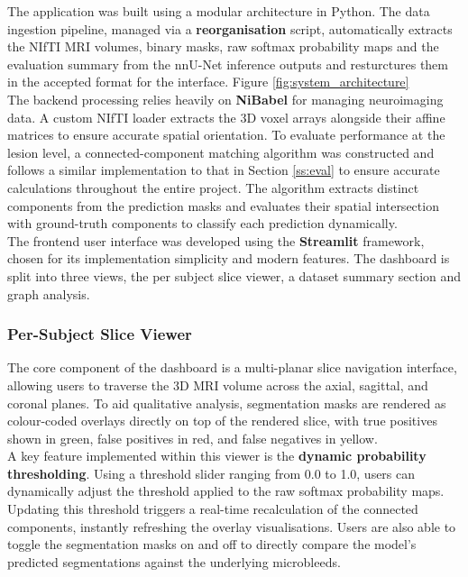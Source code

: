 \documentclass{aifyp}
\begin{document}
The application was built using a modular architecture in Python. The data ingestion pipeline, managed via a \textbf{reorganisation} script, automatically extracts the NIfTI MRI volumes, binary masks, raw softmax probability maps and the evaluation summary from the nnU-Net inference outputs and resturctures them in the accepted format for the interface.  Figure \ref{fig:system_architecture}
\\

The backend processing relies heavily on \textbf{NiBabel} for managing neuroimaging data. A custom NIfTI loader extracts the 3D voxel arrays alongside their affine matrices to ensure accurate spatial orientation. To evaluate performance at the lesion level, a connected-component matching algorithm was constructed and follows a similar implementation to that in Section \ref{ss:eval} to ensure accurate calculations throughout the entire project. The algorithm extracts distinct components from the prediction masks and evaluates their spatial intersection with ground-truth components to classify each prediction dynamically.
\\

The frontend user interface was developed using the \textbf{Streamlit} framework, chosen for its implementation simplicity and modern features. The dashboard is split into three views, the per subject slice viewer, a dataset summary section and graph analysis.

\subsubsection{Per-Subject Slice Viewer}
\label{ss:per_sub_view}
The core component of the dashboard is a multi-planar slice navigation interface, allowing users to traverse the 3D MRI volume across the axial, sagittal, and coronal planes. To aid qualitative analysis, segmentation masks are rendered as colour-coded overlays directly on top of the rendered slice, with true positives shown in green, false positives in red, and false negatives in yellow.
\\

A key feature implemented within this viewer is the \textbf{dynamic probability thresholding}. Using a threshold slider ranging from 0.0 to 1.0, users can dynamically adjust the threshold applied to the raw softmax probability maps. Updating this threshold triggers a real-time recalculation of the connected components, instantly refreshing the overlay visualisations. Users are also able to toggle the segmentation masks on and off to directly compare the model's predicted segmentations against the underlying microbleeds.
\\
\end{document}
